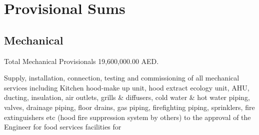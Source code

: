 \documentclass{book}
\begin{document}
\chapter{Provisional Sums}
\section{Mechanical}

Total Mechanical Provisionals 19,600,000.00 AED. 

Supply, installation, connection, testing and commissioning of all mechanical services including Kitchen hood-make up unit, hood extract ecology unit, AHU, ducting, insulation, air outlets, grills \& diffusers, cold water \& hot water piping, valves, drainage piping, floor drains, gas piping, firefighting piping, sprinklers, fire extinguishers etc (hood fire suppression system by others) to the approval of the Engineer for food services facilities for
\medskip
\end{document}
